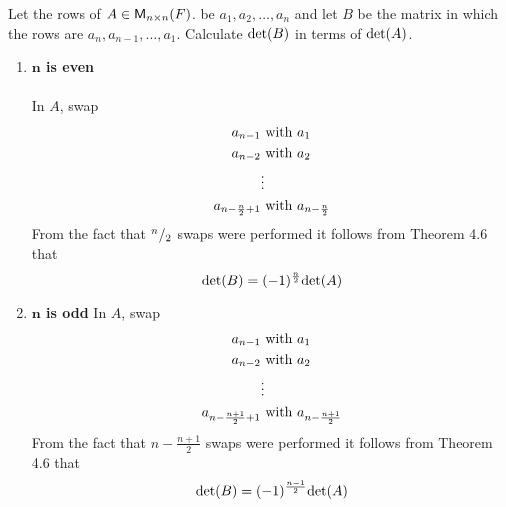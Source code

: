 Let the rows of $A \in \mathsf{M}_{n \times n}(F)$. be $a_1,a_2,\dotsc,a_n$ and let
$B$ be the matrix in which the rows are
$a_n,a_{n-1},\dotsc,a_1$. Calculate $\text{det}({B})$ in terms of $\text{det}({A})$.
\begin{enumerate}
\item {\bf $\mathbf{n}$ is even}
\paragraph{}In $A$, swap
\begin{align}
a_{n-1} &\text{ with } a_1\\
 a_{n-2} &\text{ with } a_2\\
\notag&\vdots\\
 a_{n-\frac{n}{2}+1} &\text{ with } a_{n-\frac{n}{2}}
\end{align}
From the fact that $^{n}/_{2}$ swaps were performed it follows from
Theorem 4.6 that
\begin{equation}
\text{det}({B}) = (-1)^\frac{n}{2} \text{det}({A}) 
\end{equation}
\item {\bf $\mathbf{n}$ is odd}
In $A$, swap 
\begin{align}
a_{n-1} &\text{ with } a_1\\
 a_{n-2} &\text{ with } a_2\\
\notag&\vdots\\
 a_{n-\frac{n+1}{2}+1} &\text{ with } a_{n-\frac{n+1}{2}}
\end{align}
From the fact that $n-\frac{n+1}{2}$ swaps were performed it follows
from Theorem 4.6 that
\begin{equation}
\text{det}({B}) = (-1)^{\frac{n-1}{2}}\text{det}({A})
\end{equation}
\end{enumerate}

